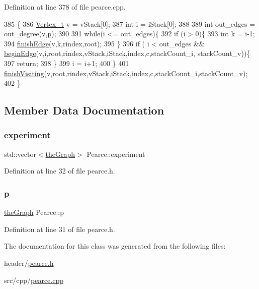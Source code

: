 Definition at line 378 of file pearce.\+cpp.


\begin{DoxyCode}
385                                            \{
386     \hyperlink{utilities_8h_a344cd987714d06997f0becda3c96d6e2}{Vertex\_t} v = vStack[0];
387     \textcolor{keywordtype}{int} i = iStack[0];
388     
389     \textcolor{keywordtype}{int} out\_edges = out\_degree(v,\hyperlink{class_pearce_a2320928312fd97f6bcb1f16684f79a03}{p});
390     
391     \textcolor{keywordflow}{while}(i <= out\_edges)\{
392         \textcolor{keywordflow}{if} (i > 0)\{
393             \textcolor{keywordtype}{int} k = i-1;
394             \hyperlink{class_pearce_a4ed2b91ac3246895ec5d70fe3530690e}{finishEdge}(v,k,rindex,root);
395         \}
396         \textcolor{keywordflow}{if} ( i < out\_edges && \hyperlink{class_pearce_a6d6c641f1815e11536554077ed18c10e}{beginEdge}(v,i,root,rindex,vStack,iStack,index,c,stackCount\_i,
      stackCount\_v))\{
397             \textcolor{keywordflow}{return};
398         \}
399         i = i+1;
400     \}
401     \hyperlink{class_pearce_a48afb6ccb75ba9df285c9701daf474b0}{finishVisiting}(v,root,rindex,vStack,iStack,index,c,stackCount\_i,stackCount\_v);
402 \}
\end{DoxyCode}


\subsection{Member Data Documentation}
\mbox{\label{class_pearce_ad33eb33876fe817143afb84583934313}} 
\subsubsection{\texorpdfstring{experiment}{experiment}}
{\footnotesize\ttfamily std\+::vector$<$\hyperlink{class_graph_component_a982e0748a6e1b8dc74986f5f8b3dca5c}{the\+Graph}$>$ Pearce\+::experiment}



Definition at line 32 of file pearce.\+h.

\mbox{\label{class_pearce_a2320928312fd97f6bcb1f16684f79a03}} 
\subsubsection{\texorpdfstring{p}{p}}
{\footnotesize\ttfamily \hyperlink{class_graph_component_a982e0748a6e1b8dc74986f5f8b3dca5c}{the\+Graph} Pearce\+::p}



Definition at line 31 of file pearce.\+h.



The documentation for this class was generated from the following files\+:\begin{DoxyCompactItemize}
\item 
header/\hyperlink{pearce_8h}{pearce.\+h}\item 
src/cpp/\hyperlink{pearce_8cpp}{pearce.\+cpp}\end{DoxyCompactItemize}
